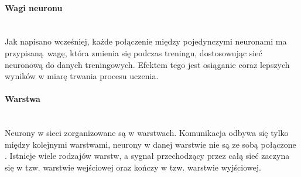 \paragraph{Wagi neuronu} \mbox{}\\
Jak napisano wcześniej, każde połączenie między pojedynczymi neuronami ma przypisaną wagę,
która zmienia się podczas treningu, dostosowując sieć neuronową do danych treningowych.
Efektem tego jest osiąganie coraz lepszych wyników w miarę trwania procesu uczenia.

\paragraph{Warstwa} \mbox{}\\
Neurony w sieci zorganizowane są w warstwach. Komunikacja odbywa się tylko między kolejnymi
warstwami, neurony w danej warstwie nie są ze sobą połączone \cite{CS231n, substBigConv}.
Istnieje wiele rodzajów warstw, a sygnał przechodzący przez całą sieć zaczyna się w tzw.
warstwie wejściowej oraz kończy w tzw. warstwie wyjściowej.

